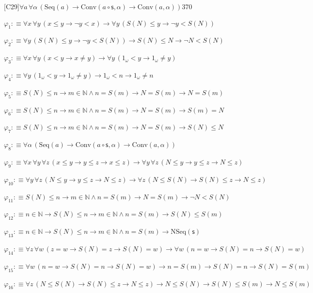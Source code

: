 \begin{fullproof}{[C29]}{$\forall a\,\forall \alpha\,(\mathrm{Seq}(a) \to \mathrm{Conv}(a \circ \mathsf{s},\alpha) \to \mathrm{Conv}(a,\alpha))$}{370}
\begin{ptree}
\end{ptree}
\begin{abbrevlist}
\item $\varphi_{1} :\equiv \forall x\,\forall y\,(x \leq y \to \neg y < x) \to \forall y\,(S(N) \leq y \to \neg y < S(N))$
\item $\varphi_{2} :\equiv \forall y\,(S(N) \leq y \to \neg y < S(N)) \to S(N) \leq N \to \neg N < S(N)$
\item $\varphi_{3} :\equiv \forall x\,\forall y\,(x < y \to x \neq y) \to \forall y\,(1_{\omega} < y \to 1_{\omega} \neq y)$
\item $\varphi_{4} :\equiv \forall y\,(1_{\omega} < y \to 1_{\omega} \neq y) \to 1_{\omega} < n \to 1_{\omega} \neq n$
\item $\varphi_{5} :\equiv S(N) \leq n \to m \in \mathbb{N} \land n = S(m) \to N = S(m) \to N = S(m)$
\item $\varphi_{6} :\equiv S(N) \leq n \to m \in \mathbb{N} \land n = S(m) \to N = S(m) \to S(m) = N$
\item $\varphi_{7} :\equiv S(N) \leq n \to m \in \mathbb{N} \land n = S(m) \to N = S(m) \to S(N) \leq N$
\item $\varphi_{8} :\equiv \forall \alpha\,(\mathrm{Seq}(a) \to \mathrm{Conv}(a \circ \mathsf{s},\alpha) \to \mathrm{Conv}(a,\alpha))$
\item $\varphi_{9} :\equiv \forall x\,\forall y\,\forall z\,(x \leq y \to y \leq z \to x \leq z) \to \forall y\,\forall z\,(N \leq y \to y \leq z \to N \leq z)$
\item $\varphi_{10} :\equiv \forall y\,\forall z\,(N \leq y \to y \leq z \to N \leq z) \to \forall z\,(N \leq S(N) \to S(N) \leq z \to N \leq z)$
\item $\varphi_{11} :\equiv S(N) \leq n \to m \in \mathbb{N} \land n = S(m) \to N = S(m) \to \neg N < S(N)$
\item $\varphi_{12} :\equiv n \in \mathbb{N} \to S(N) \leq n \to m \in \mathbb{N} \land n = S(m) \to S(N) \leq S(m)$
\item $\varphi_{13} :\equiv n \in \mathbb{N} \to S(N) \leq n \to m \in \mathbb{N} \land n = S(m) \to \mathrm{NSeq}(\mathsf{s})$
\item $\varphi_{14} :\equiv \forall z\,\forall w\,(z = w \to S(N) = z \to S(N) = w) \to \forall w\,(n = w \to S(N) = n \to S(N) = w)$
\item $\varphi_{15} :\equiv \forall w\,(n = w \to S(N) = n \to S(N) = w) \to n = S(m) \to S(N) = n \to S(N) = S(m)$
\item $\varphi_{16} :\equiv \forall z\,(N \leq S(N) \to S(N) \leq z \to N \leq z) \to N \leq S(N) \to S(N) \leq S(m) \to N \leq S(m)$

\end{abbrevlist}
\end{fullproof}
